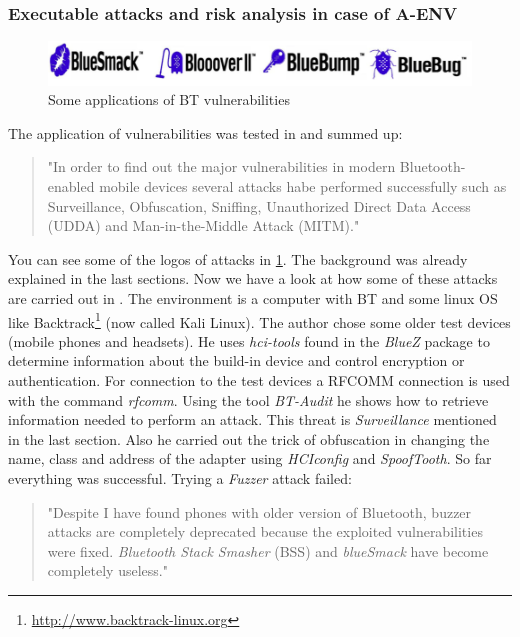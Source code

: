 \documentclass[12pt,a4paper]{article}
\begin{document}
\subsubsection{Executable attacks and risk analysis in case of A-ENV}

\begin{figure}[h]
\begin{center}
\includegraphics[scale=0.4]{img/bt_attack_logos.png}
\caption{Some applications of BT vulnerabilities \cite{DBLP:journals/corr/abs-1206-1482}}
\label{img_bt_attack_logos}
\end{center}
\end{figure}
The application of vulnerabilities was tested in \cite{DBLP:journals/corr/abs-1206-1482} and summed up:
\begin{quote}
"In order to find out the major vulnerabilities in modern Bluetooth-enabled mobile devices several attacks habe performed successfully such as Surveillance, Obfuscation, Sniffing, Unauthorized Direct Data Access (UDDA) and Man-in-the-Middle Attack (MITM)." \cite{DBLP:journals/corr/abs-1206-1482}
\end{quote}
You can see some of the logos of attacks in \ref{img_bt_attack_logos}. The background was already explained in the last sections. Now we have a look at how some of these attacks are carried out in \cite{DBLP:journals/corr/abs-1206-1482}. The environment is a computer with BT and some linux OS like Backtrack\footnote{\url{http://www.backtrack-linux.org}} (now called Kali Linux). The author chose some older test devices (mobile phones and headsets). He uses \emph{hci-tools} found in the  \emph{BlueZ} package to determine information about the build-in device and control encryption or authentication. For connection to the test devices a RFCOMM connection is used with the command \emph{rfcomm}. Using the tool \emph{BT-Audit} he shows how to retrieve information needed to perform an attack. This threat is \emph{Surveillance} mentioned in the last section. Also he carried out the trick of obfuscation in changing the name, class and address of the adapter using \emph{HCIconfig} and \emph{SpoofTooth}. So far everything was successful. Trying a \emph{Fuzzer} attack failed:
\begin{quote}
"Despite I have found phones with older version of Bluetooth, buzzer attacks are completely deprecated because the exploited vulnerabilities were fixed. \emph{Bluetooth Stack Smasher} (BSS) and \emph{blueSmack} have become completely useless." \cite{DBLP:journals/corr/abs-1206-1482}
\end{quote}
\end{document}
